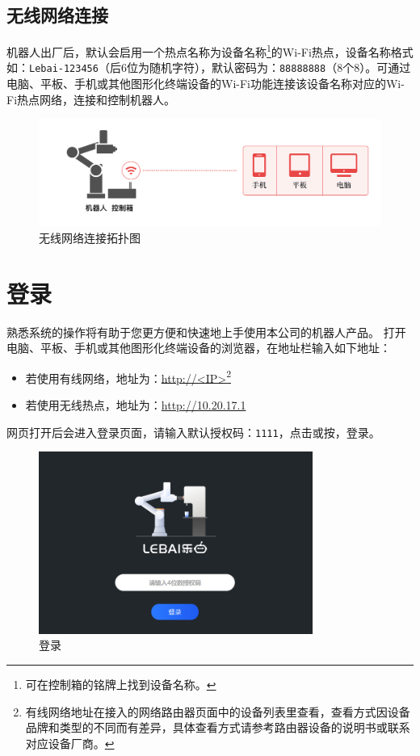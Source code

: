 \clearpage

\subsection{无线网络连接}
机器人出厂后，默认会启用一个热点名称为设备名称\footnote{可在控制箱的铭牌上找到设备名称。}的Wi-Fi热点，设备名称格式如：\verb|Lebai-123456|（后6位为随机字符），默认密码为：\verb|88888888|（8个8）。可通过电脑、平板、手机或其他图形化终端设备的Wi-Fi功能连接该设备名称对应的Wi-Fi热点网络，连接和控制机器人。

\begin{figure}[ht]
    \centering
    \includegraphics[width=\textwidth]{image/network-2.pdf}
    \caption{无线网络连接拓扑图}
    \label{fig:无线网络连接拓扑图}
\end{figure}

\clearpage

\section{登录\LM}
熟悉\LM 系统的操作将有助于您更方便和快速地上手使用本公司的机器人产品。
打开电脑、平板、手机或其他图形化终端设备的浏览器，在地址栏输入如下地址：
\begin{itemize}
	\item 若使用有线网络，地址为：\url{http://<IP>}\footnote{有线网络地址在接入的网络路由器页面中的设备列表里查看，查看方式因设备品牌和类型的不同而有差异，具体查看方式请参考路由器设备的说明书或联系对应设备厂商。}
	\item 若使用无线热点，地址为：\url{http://10.20.17.1}
\end{itemize}

网页打开后会进入登录页面，请输入默认授权码：\verb|1111|，点击或按，登录\LM。

\begin{figure}[ht]
    \centering
    \includegraphics[width=0.8\textwidth]{screen/2-4.png}
    \caption{登录\LM}
    \label{fig:登录LM}
\end{figure}


